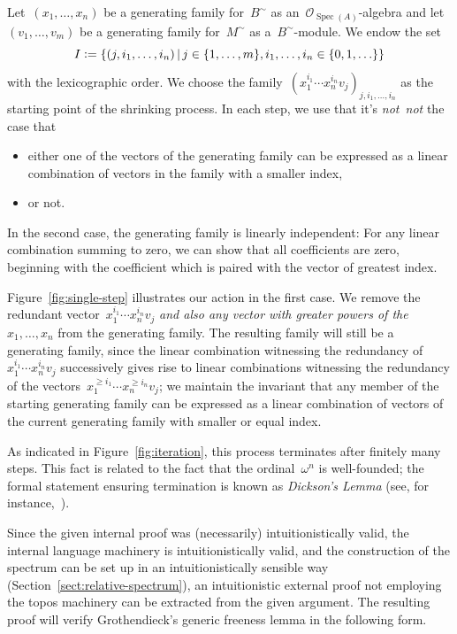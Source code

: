 \documentclass[10pt,reqno,a4paper]{amsbook}
\makeatletter
\theoremstyle{definition}
\theoremstyle{plain}
\theoremstyle{remark}
\renewcommand{\O}{\mathcal{O}}
\DeclareMathOperator{\Spec}{Spec}
\newcommand{\?}{\,{:}\,}
\renewcommand{\_}{\mathpunct{.}\,}
\newcommand{\notnot}{\emph{not~not}\xspace}
\newcommand{\defeq}{\vcentcolon=}
\renewenvironment{proof}[1][\proofname]{\par
  \pushQED{\qed}%
  \normalfont \topsep6\p@\@plus6\p@\relax
  \trivlist
  \item[\hskip\labelsep
        \itshape
    #1\@addpunct{.}]\ignorespaces
}{%
  \popQED\endtrivlist\@endpefalse
}
\makeatother
\begin{document}
\begin{proof}[Proof of Theorem~\ref{thm:generic-freeness}]
Let~$(x_1,\ldots,x_n)$ be a generating family for~$B^\sim$ as
an~$\O_{\Spec(A)}$-algebra and let $(v_1,\ldots,v_m)$ be a generating
family for~$M^\sim$ as a~$B^\sim$-module. We endow the set
\[ I \defeq \{ (j, i_1,\ldots,i_n) \,|\,
  j \in \{ 1,\ldots,m \},
  i_1,\ldots,i_n \in \{ 0,1,\ldots \} \} \]
with the lexicographic order. We choose the family~$(x_1^{i_1} \cdots x_n^{i_n}
v_j)_{j,i_1,\ldots,i_n}$ as the starting point of the shrinking process. In
each step, we use that it's \notnot the case that
\begin{itemize}
\item either one of the vectors of the generating family can be expressed as a
linear combination of vectors in the family with a smaller index,
\item or not.
\end{itemize}

In the second case, the generating family is linearly independent: For any
linear combination summing to zero, we can show that all coefficients are zero,
beginning with the coefficient which is paired with the vector of greatest
index.

Figure~\ref{fig:single-step} illustrates our action in the first case. We remove the redundant vector~$x_1^{i_1} \cdots x_n^{i_n}
v_j$ \emph{and also any vector with greater powers of the~$x_1,\ldots,x_n$}
from the generating family. The resulting family will still be a generating
family, since the linear combination witnessing the redundancy of~$x_1^{i_1}
\cdots x_n^{i_n} v_j$ successively gives rise to linear combinations witnessing
the redundancy of the vectors~$x_1^{\geq i_1} \cdots x_n^{\geq i_n} v_j$;
we maintain the invariant that any member of the starting generating family can
be expressed as a linear combination of vectors of the current generating
family with smaller or equal index.

As indicated in Figure~\ref{fig:iteration}, this process terminates after
finitely many steps. This fact is related to the fact that the ordinal~$\omega^n$ is
well-founded; the formal statement ensuring termination is known as
\emph{Dickson's Lemma} (see, for instance,~\cite[Thm.~1.1]{veldman:kruskal}).
\end{proof}

Since the given internal proof was (necessarily) intuitionistically valid, the
internal language machinery is intuitionistically valid, and the construction
of the spectrum can be set up in an intuitionistically sensible way
(Section~\ref{sect:relative-spectrum}), an intuitionistic external proof not
employing the topos machinery can be extracted from the given argument.
The resulting proof will verify Grothendieck's generic freeness lemma in the
following form.
\end{document}

